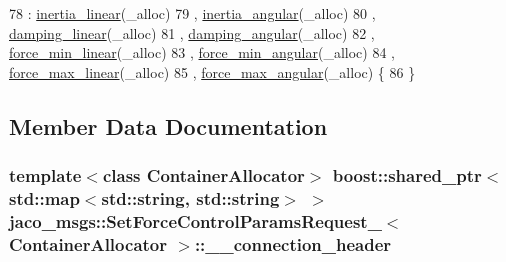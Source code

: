 \begin{DoxyCode}
78     : \hyperlink{structjaco__msgs_1_1SetForceControlParamsRequest___a1163bd5470638964c3bd0f3146617695}{inertia\_linear}(\_alloc)
79     , \hyperlink{structjaco__msgs_1_1SetForceControlParamsRequest___aee7ba36455fcb2b5ea168a5bf6331b7b}{inertia\_angular}(\_alloc)
80     , \hyperlink{structjaco__msgs_1_1SetForceControlParamsRequest___a8512d209d48fdb9db5ada5584e41033b}{damping\_linear}(\_alloc)
81     , \hyperlink{structjaco__msgs_1_1SetForceControlParamsRequest___aad2dc5a6c218abdb8723023e6ea7aa40}{damping\_angular}(\_alloc)
82     , \hyperlink{structjaco__msgs_1_1SetForceControlParamsRequest___a6acec93f53a7132d740aa0335a05a36d}{force\_min\_linear}(\_alloc)
83     , \hyperlink{structjaco__msgs_1_1SetForceControlParamsRequest___ab84d0d8b19f11eca2319c4ef903caafd}{force\_min\_angular}(\_alloc)
84     , \hyperlink{structjaco__msgs_1_1SetForceControlParamsRequest___a89805bac05f838a5bc70a641539715f0}{force\_max\_linear}(\_alloc)
85     , \hyperlink{structjaco__msgs_1_1SetForceControlParamsRequest___afa6dc239b7bd0cd6b43b4ccea1ec92af}{force\_max\_angular}(\_alloc)  \{
86     \}
\end{DoxyCode}


\subsection{Member Data Documentation}
\subsubsection[{\texorpdfstring{\+\_\+\+\_\+connection\+\_\+header}{__connection_header}}]{\setlength{\rightskip}{0pt plus 5cm}template$<$class Container\+Allocator$>$ boost\+::shared\+\_\+ptr$<$std\+::map$<$std\+::string, std\+::string$>$ $>$ {\bf jaco\+\_\+msgs\+::\+Set\+Force\+Control\+Params\+Request\+\_\+}$<$ Container\+Allocator $>$\+::\+\_\+\+\_\+connection\+\_\+header}\hypertarget{structjaco__msgs_1_1SetForceControlParamsRequest___a5fbf5d5d93bc38b2dcaf78f0cc37718e}{}\label{structjaco__msgs_1_1SetForceControlParamsRequest___a5fbf5d5d93bc38b2dcaf78f0cc37718e}
